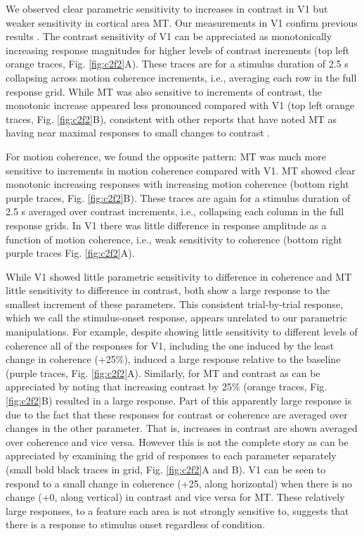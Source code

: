 We observed clear parametric sensitivity to increases in contrast in V1 but weaker sensitivity in cortical area MT. Our measurements in V1 confirm previous results \citep{Gardner2005-pg,Logothetis2001-kk,Tootell1995-gq,Tootell1998-mr}. The contrast sensitivity of V1 can be appreciated as monotonically increasing response magnitudes for higher levels of contrast increments (top left orange traces, Fig. \ref{fig:c2f2}A). These traces are for a stimulus duration of 2.5 s collapsing across motion coherence increments, i.e., averaging each row in the full response grid. While MT was also sensitive to increments of contrast, the monotonic increase appeared less pronounced compared with V1 (top left orange traces, Fig. \ref{fig:c2f2}B), consistent with other reports that have noted MT as having near maximal responses to small changes to contrast \citep{Sclar1990-lk,Tootell1995-gq}.

For motion coherence, we found the opposite pattern: MT was much more sensitive to increments in motion coherence compared with V1. MT showed clear monotonic increasing responses with increasing motion coherence (bottom right purple traces, Fig. \ref{fig:c2f2}B). These traces are again for a stimulus duration of 2.5 s averaged over contrast increments, i.e., collapsing each column in the full response grids. In V1 there was little difference in response amplitude as a function of motion coherence, i.e., weak sensitivity to coherence (bottom right purple traces Fig. \ref{fig:c2f2}A).

While V1 showed little parametric sensitivity to difference in coherence and MT little sensitivity to difference in contrast, both show a large response to the smallest increment of these parameters. This consistent trial-by-trial response, which we call the stimulus-onset response, appears unrelated to our parametric manipulations. For example, despite showing little sensitivity to different levels of coherence all of the responses for V1, including the one induced by the least change in coherence (+25\%), induced a large response relative to the baseline (purple traces, Fig. \ref{fig:c2f2}A). Similarly, for MT and contrast as can be appreciated by noting that increasing contrast by 25\% (orange traces, Fig. \ref{fig:c2f2}B) resulted in a large response. Part of this apparently large response is due to the fact that these responses for contrast or coherence are averaged over changes in the other parameter. That is, increases in contrast are shown averaged over coherence and vice versa. However this is not the complete story as can be appreciated by examining the grid of responses to each parameter separately (small bold black traces in grid, Fig. \ref{fig:c2f2}A and B). V1 can be seen to respond to a small change in coherence (+25, along horizontal) when there is no change (+0, along vertical) in contrast and vice versa for MT. These relatively large responses, to a feature each area is not strongly sensitive to, suggests that there is a response to stimulus onset regardless of condition.

